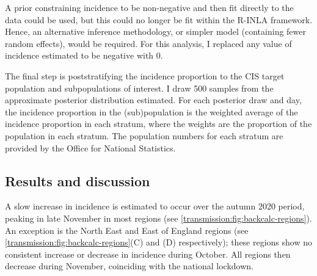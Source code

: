 \documentclass[thesis.tex]{subfiles}
\begin{document}
A prior constraining incidence to be non-negative and then fit directly to the data could be used, but this could no longer be fit within the R-INLA framework.
Hence, an alternative inference methodology, or simpler model (\eg containing fewer random effects), would be required.
For this analysis, I replaced any value of incidence estimated to be negative with 0.

The final step is poststratifying the incidence proportion to the CIS target population and subpopulations of interest.
I draw 500 samples from the approximate posterior distribution estimated.
For each posterior draw and day, the incidence proportion in the (sub)population is the weighted average of the incidence proportion in each stratum, where the weights are the proportion of the population in each stratum.
The population numbers for each stratum are provided by the Office for National Statistics.

\subsection{Results and discussion} \label{backcalc:sec:results}

A slow increase in incidence is estimated to occur over the autumn 2020 period, peaking in late November in most regions (see \cref{transmission:fig:backcalc-regions}).
An exception is the North East and East of England regions (see \cref{transmission:fig:backcalc-regions}(C) and (D) respectively); these regions show no consistent increase or decrease in incidence during October.
All regions then decrease during November, coinciding with the national lockdown.
\end{document}

